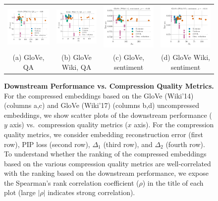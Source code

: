 \begin{figure}
\begin{tabular}{@{\hskip -0.0in}c@{\hskip -0.0in}c@{\hskip -0.0in}c@{\hskip -0.0in}c@{\hskip -0.0in}}
		\includegraphics[width=.245\linewidth]{figures/glove400k_qa_best-f1_vs_gram-large-dim-delta2-2_linx_stoc.pdf} &
		\includegraphics[width=.245\linewidth]{figures/glove-wiki400k-am_qa_best-f1_vs_gram-large-dim-delta2-2_linx_stoc.pdf} &
		\includegraphics[width=.245\linewidth]{figures/glove400k_sentiment_sst_test-acc_vs_gram-large-dim-delta2-2_linx_stoc.pdf} &
		\includegraphics[width=.245\linewidth]{figures/glove-wiki400k-am_sentiment_sst_test-acc_vs_gram-large-dim-delta2-2_linx_stoc.pdf} \\
		(a) GloVe, QA & (b) GloVe Wiki, QA  & (c) GloVe, sentiment & (d) GloVe Wiki, sentiment
	\end{tabular}
	\caption{
		\textbf{Downstream Performance vs. Compression Quality Metrics.}
		For the compressed embeddings based on the GloVe (Wiki'14) (columns a,c) and GloVe (Wiki'17) (columns b,d) uncompressed embeddings, we show scatter plots of the downstream performance ($y$ axis) vs.\ compression quality metrics ($x$ axis).
		For the compression quality metrics, we consider embedding reconstruction error (first row), PIP loss (second row), $\Delta_1$ (third row), and $\Delta_2$ (fourth row).
		To understand whether the ranking of the compressed embeddings based on the various compression quality metrics are well-correlated with the ranking based on the downstream performance, we expose the Spearman's rank correlation coefficient ($\rho$) in the title of each plot (large $|\rho|$ indicates strong correlation).
}
\end{figure}
